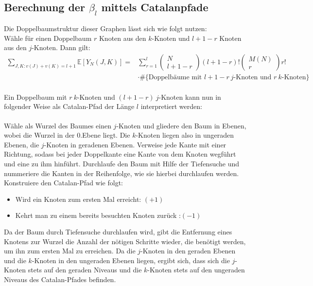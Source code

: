 \documentclass[a4paper, 11pt]{scrreprt}
\newcommand{\EE}{\mathbb{E}}
\begin{document}
\subsection*{Berechnung der $ \beta_l $ mittels Catalanpfade}
Die Doppelbaumstruktur dieser Graphen lässt sich wie folgt nutzen:\\
Wähle für einen Doppelbaum \(r\) Knoten aus den \(k\)-Knoten und \(l+1-r\) Knoten aus den \(j\)-Knoten. Dann gilt:
\begin{equation}
	\begin{split}
	\sum_{J,K: v(J)+v(K) = l+1} \EE[Y_N(J,K)] = &\sum_{r=1}^{l}\begin{pmatrix} N\\ l+1-r\end{pmatrix} (l+1-r)! \begin{pmatrix} M(N)\\r\end{pmatrix} r! \\
	&\cdot \#\{\text{Doppelbäume mit }l+1-r\ j\text{-Knoten und } r\ k\text{-Knoten}\} \\
	\end{split}
\end{equation}

Ein Doppelbaum mit \(r\  k\)-Knoten und \((l+1-r)\ j\)-Knoten kann nun in folgender Weise als Catalan-Pfad der Länge \(l\) interpretiert werden:\\\\
Wähle als Wurzel des Baumes einen \(j\)-Knoten und gliedere den Baum in Ebenen, wobei die Wurzel in der 0.Ebene liegt. Die \(k\)-Knoten liegen also in ungeraden Ebenen, die \(j\)-Knoten in geradenen Ebenen. Verweise jede Kante mit einer Richtung, sodass bei jeder Doppelkante eine Kante von dem Knoten wegführt und eine zu ihm hinführt. Durchlaufe den Baum mit Hilfe der Tiefensuche und nummeriere die Kanten in der Reihenfolge, wie sie hierbei durchlaufen werden. Konstruiere den Catalan-Pfad wie folgt:
\begin{itemize}
	\item Wird ein Knoten zum ersten Mal erreicht: \((+1)\)
	\item Kehrt man zu einem bereits besuchten Knoten zurück :\((-1)\)
	
\end{itemize}
Da der Baum durch Tiefensuche durchlaufen wird, gibt die Entfernung eines Knotens zur Wurzel die Anzahl der nötigen Schritte wieder, die benötigt werden, um ihn zum ersten Mal zu erreichen. Da die \(j\)-Knoten in den geraden Ebenen und die \(k\)-Knoten in den ungeraden Ebenen liegen, ergibt sich, dass sich die \(j\)-Knoten stets auf den geraden Niveaus und die \(k\)-Knoten stets auf den ungeraden Niveaus des Catalan-Pfades befinden. 
\end{document}
